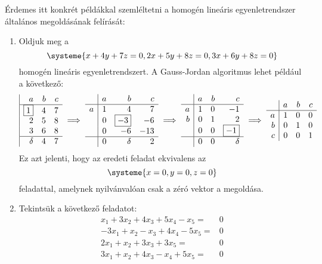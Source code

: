\documentclass[9pt, showtrims]{memoir}
\theoremstyle{plain}
\theoremstyle{remark}
\theoremstyle{definition}
\begin{document}
Érdemes itt konkrét példákkal szemléltetni a homogén lineáris egyenletrendszer általános megoldásának felírását:
\begin{enumerate}
    \item 
Oldjuk meg a 
\[
\systeme{ x+4y+7z=0,
         2x+5y+8z=0,
         3x+6y+8z=0
     }
\]
homogén  lineáris egyenletrendszert.
A Gauss-Jordan algoritmus lehet például a következő:
\[
    \begin{array}{|rrr}
        a&b&c\\
        \hline
        \boxed{1}&4&7\\
        2&5&8\\
        3&6&8\\
        \hline
        \delta&4&7
    \end{array}
    \implies
    \begin{array}{r|rrr}
        &a&b&c\\
        \hline
    a &  1&4&7\\
      &  0&\boxed{-3}&-6\\
      &  0&-6&-13\\
        \hline
      &  0&\delta&2
    \end{array}
    \implies
    \begin{array}{r|rrr}
        &a&b&c\\
        \hline
    a &  1&0&-1\\
    b &  0&1&2\\
    &  0&0&\boxed{-1}\\
        \hline
      &  0&0&\delta
    \end{array}
    \implies
    \begin{array}{r|rrr}
        &a&b&c\\
        \hline
    a &  1&0&0\\
    b &  0&1&0\\
    c &  0&0&1
    \end{array}
\]
Ez azt jelenti, hogy az eredeti feladat ekvivalens az
\[\systeme{x=0,y=0,z=0}\]
feladattal, amelynek nyilvánvalóan csak a zéró vektor a megoldása.
\item
    Tekintsük a következő feladatot:
    \[
        \begin{array}{rl}
            x_1+3x_2+4x_3+5x_4-x_5=&0\\
            -3x_1+x_2-x_3+4x_4-5x_5=&0\\
            2x_1+x_2+3x_3+3x_5=&0\\
            3x_1+x_2+4x_3-x_4+5x_5=&0
        \end{array}
\]
\end{enumerate}
\end{document}
